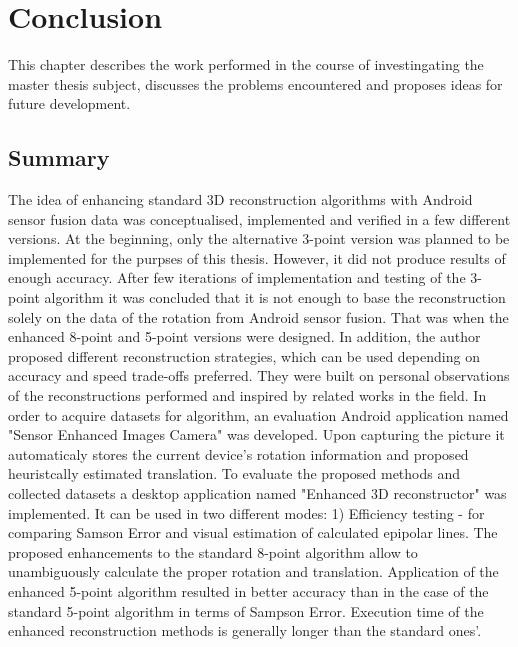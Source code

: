 
\chapter{Conclusion} %
This chapter describes the work performed in the course of investingating the master thesis subject, discusses the problems encountered and proposes ideas for future development.

\section{Summary}
The idea of enhancing standard 3D reconstruction algorithms with Android sensor fusion data was conceptualised, implemented and verified in a few different versions. At the beginning, only the alternative 3-point version was planned to be implemented for the purpses of this thesis. However, it did not produce results of enough accuracy. After few iterations of implementation and testing of the 3-point algorithm it was concluded that it is not enough to base the reconstruction solely on the data of the rotation from Android sensor fusion. That was when the enhanced 8-point and 5-point versions were designed. In addition, the author proposed different reconstruction strategies, which can be used depending on accuracy and speed trade-offs preferred. They were built on personal observations of the reconstructions performed and inspired by related works in the field.
In order to acquire datasets for algorithm, an evaluation Android application named "Sensor Enhanced Images Camera" was developed. Upon capturing the picture it automaticaly stores the current device's rotation information and proposed heuristcally estimated translation. 
To evaluate the proposed methods and collected datasets a desktop application named "Enhanced 3D reconstructor" was implemented.
It can be used in two different modes:
1) Efficiency testing - for comparing  Samson Error and visual estimation of calculated epipolar lines.   
The proposed enhancements to the standard 8-point algorithm allow to unambiguously calculate the proper rotation and translation. Application of the enhanced 5-point algorithm resulted in better accuracy than in the case of the standard 5-point algorithm in terms of Sampson Error. Execution time of the enhanced reconstruction methods is generally longer than the standard ones'. 
